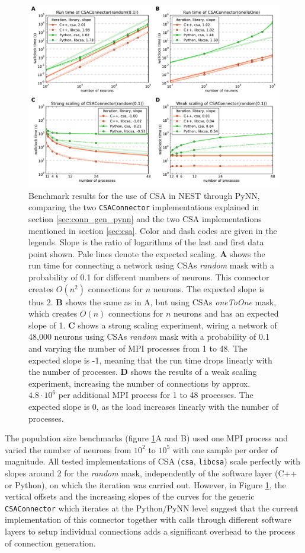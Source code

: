 \documentclass{frontiersSCNS} %
\begin{document}
\begin{figure}[ht]
\centering
\includegraphics[scale=.7]{benchmarks/CSAConnector.pdf}
\caption{Benchmark results for the use of CSA in NEST through PyNN,
  comparing the two \texttt{CSAConnector} implementations explained in
  section \ref{sec:conn_gen_pynn} and the two CSA implementations
  mentioned in section \ref{sec:csa}. Color and dash codes are given
  in the legends. Slope is the ratio of logarithms of the last and
  first data point shown. Pale lines denote the expected
  scaling. \textbf{A} shows the run time for connecting a network
  using CSAs \emph{random} mask with a probability of 0.1 for
  different numbers of neurons. This connector creates $O(n^2)$
  connections for $n$ neurons. The expected slope is thus
  2. \textbf{B} shows the same as in A, but using CSAs \emph{oneToOne}
  mask, which creates $O(n)$ connections for $n$ neurons and has an
  expected slope of 1. \textbf{C} shows a strong scaling experiment,
  wiring a network of 48,000 neurons using CSAs \emph{random} mask
  with a probability of 0.1 and varying the number of MPI processes
  from 1 to 48. The expected slope is -1, meaning that the run time
  drops linearly with the number of processes. \textbf{D} shows the
  results of a weak scaling experiment, increasing the number of
  connections by approx. $4.8 \cdot 10^6$ per additional MPI process
  for 1 to 48 processes. The expected slope is 0, as the load
  increases linearly with the number of
  processes.}\label{fig:pynn_benchmarks}
\end{figure}

The population size benchmarks (figure \ref{fig:pynn_benchmarks}A and
B) used one MPI process and varied the number of neurons from $10^2$
to $10^5$ with one sample per order of magnitude. All tested
implementations of CSA (\verb|csa|, \verb|libcsa|) scale perfectly
with slopes around 2 for the \emph{random} mask, independently of the
software layer (C++ or Python), on which the iteration was carried
out. However, in Figure \ref{fig:pynn_benchmarks}, the vertical
offsets and the increasing slopes of the curves for the generic
\verb|CSAConnector| which iterates at the Python/PyNN level suggest
that the current implementation of this connector together with calls
through different software layers to setup individual connections adds
a significant overhead to the process of connection generation.
\end{document}
